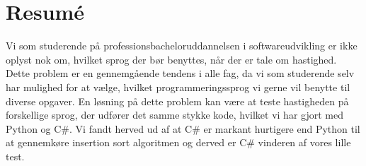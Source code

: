 \documentclass[class=report, crop=false]{standalone}
\begin{document}
    \section{Resumé}
    Vi som studerende på professionsbacheloruddannelsen i softwareudvikling er ikke oplyst nok om, hvilket sprog der bør benyttes, når der er tale om hastighed.
    Dette problem er en gennemgående tendens i alle fag, da vi som studerende selv har mulighed for at vælge, hvilket programmeringssprog vi gerne vil benytte til diverse opgaver.
    En løsning på dette problem kan være at teste hastigheden på forskellige sprog, der udfører det samme stykke kode, hvilket vi har gjort med Python og C\#.
    Vi fandt herved ud af at C\# er markant hurtigere end Python til at gennemkøre insertion sort algoritmen og derved er C\# vinderen af vores lille test.
\end{document}
